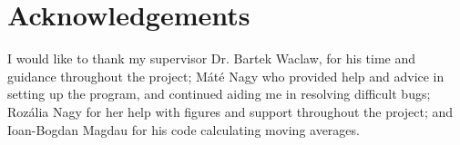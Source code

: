 \documentclass[a4paper,12pt]{article}
\begin{document}
	
	\section*{Acknowledgements}
	
	I would like to thank my supervisor Dr. Bartek Waclaw, for his time and guidance throughout the project; Máté Nagy who provided help and advice in setting up the program, and continued aiding me in resolving difficult bugs; Rozália Nagy for her help with figures and support throughout the project; and Ioan-Bogdan Magdau for his code calculating moving averages. 

	
	


\end{document}
